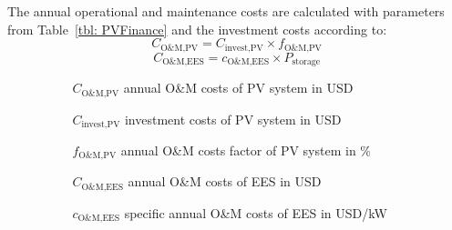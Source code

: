The annual operational and maintenance costs are calculated with parameters from Table~\ref{tbl: PVFinance} and the investment costs according to:
\begin{equation}
C_{\text{O\&M,PV}} = C_{\text{invest,PV}} \times f_{\text{O\&M,PV}}
\end{equation} 
\begin{equation}
C_{\text{O\&M,EES}} = c_{\text{O\&M,EES}} \times P_{\text{storage}}
\end{equation} 
\begin{itemize}
\item[ ] 
\begin{itemize}
\item[ ] 
\begin{itemize}
\item[$C_{\text{O\&M,PV}}$]annual O\&M costs of PV system in USD
\item[$C_{\text{invest,PV}}$]investment costs of PV system in USD
\item[$f_{\text{O\&M,PV}}$]annual O\&M costs factor of PV system in \%
\item[$C_{\text{O\&M,EES}}$]annual O\&M costs of EES in USD
\item[$c_{\text{O\&M,EES}}$]specific annual O\&M costs of EES in USD/kW
\end{itemize}
\end{itemize}
\end{itemize}
 
\pagebreak